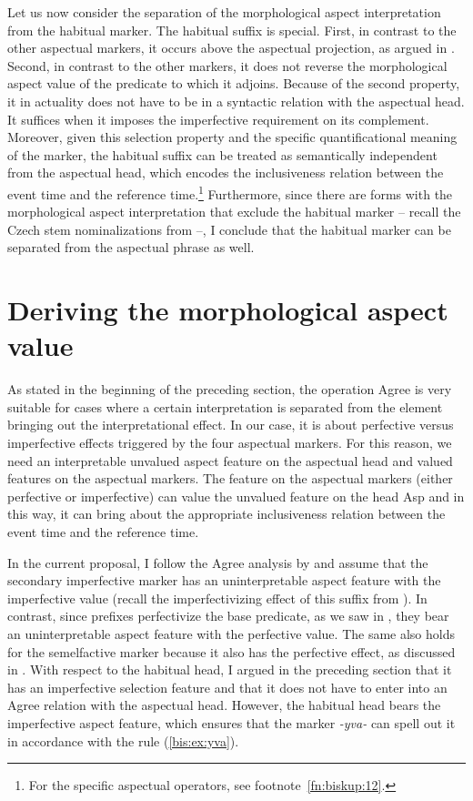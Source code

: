 \documentclass[output=paper]{langscibook}
\begin{document}
Let us now consider the separation of the morphological aspect interpretation from the habitual marker. The habitual suffix is special. First, in contrast to the other aspectual markers, it occurs above the aspectual projection, as argued in . Second, in contrast to the other markers, it does not reverse the morphological aspect value of the predicate to which it adjoins. Because of the second property, it in actuality does not have to be in a syntactic relation with the aspectual head. It suffices when it imposes the imperfective requirement on its complement. Moreover, given this selection property and the specific quantificational meaning of the marker, the habitual suffix can be treated as semantically independent from the aspectual head, which encodes the inclusiveness relation between the event time and the reference time.\footnote{For the specific aspectual operators, see footnote~\ref{fn:biskup:12}.} Furthermore, since there are forms with the morphological aspect interpretation that exclude the habitual marker – recall the Czech stem nominalizations from  –, I conclude that the habitual marker can be separated from the aspectual phrase as well.

\section{Deriving the morphological aspect value}\label{bis:sec:der} 

As stated in the beginning of the preceding section, the operation Agree is very suitable for cases where a certain interpretation is separated from the element bringing out the interpretational effect. In our case, it is about perfective versus imperfective effects triggered by the four aspectual markers. For this reason, we need an interpretable unvalued aspect feature on the aspectual head and valued features on the aspectual markers. The feature on the aspectual markers (either perfective or imperfective) can value the unvalued feature on the head Asp and in this way, it can bring about the appropriate inclusiveness relation between the event time and the reference time.

In the current proposal, I follow the Agree analysis by \citet{Biskup2020} and assume that the secondary imperfective marker has an uninterpretable aspect feature with the imperfective value (recall the imperfectivizing effect of this suffix from ). In contrast, since prefixes perfectivize the base predicate, as we saw in , they bear an uninterpretable aspect feature with the perfective value. The same also holds for the semelfactive marker because it also has the perfective effect, as discussed in . With respect to the habitual head, I argued in the preceding section that it has an imperfective selection feature and that it does not have to enter into an Agree relation with the aspectual head. However, the habitual head bears the imperfective aspect feature, which ensures that the marker \textit{-yva-} can spell out it in accordance with the rule (\ref{bis:ex:yva}).
\end{document}
